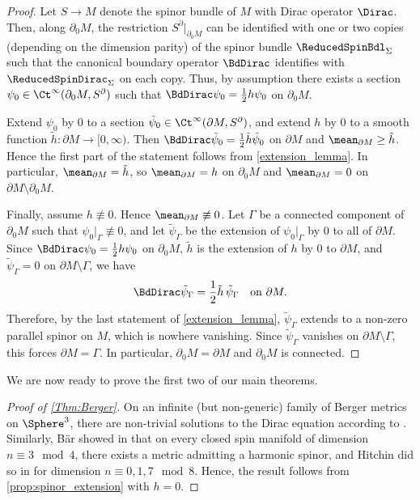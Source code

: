 \documentclass[a4paper,11pt]{amsart}
\numberwithin{equation}{section}
\begin{document}
\begin{proof}
    Let \(S \to M\) denote the spinor bundle of \(M\) with Dirac operator \(\Dirac\).
    Then, along \(\partial_0 M\), the restriction \(S^\partial|_{\partial_0 M}\) can be identified with one or two copies (depending on the dimension parity) of the spinor bundle \(\ReducedSpinBdl_\Sigma\) such that the canonical boundary operator \(\BdDirac\) identifies with \(\ReducedSpinDirac_\Sigma\) on each copy.
    Thus, by assumption there exists a section \(\psi_0 \in \Ct^\infty(\partial_0 M, S^\partial)\) such that \(\BdDirac \psi_0 = \frac{1}{2} h \psi_0\) on \(\partial_0 M\).

    Extend \(\psi_0\) by \(0\) to a section \(\tilde\psi_0 \in \Ct^\infty(\partial M, S^\partial)\), and extend \(h\) by \(0\) to a smooth function \(\tilde h \colon \partial M \to [0,\infty)\).
    Then \(\BdDirac \tilde\psi_0 = \frac{1}{2} \tilde h \tilde\psi_0\) on \(\partial M\) and \(\mean_{\partial M} \geq \tilde h\).
    Hence the first part of the statement follows from \cref{extension_lemma}.
    In particular, \(\mean_{\partial M}=\tilde h\), so \(\mean_{\partial M}=h\) on \(\partial_0M\) and \(\mean_{\partial M}=0\) on \(\partial M\setminus\partial_0M\).

    Finally, assume \(h \not\equiv 0\).
    Hence \(\mean_{\partial M}\not\equiv 0\).
    Let \(\Gamma\) be a connected component of \(\partial_0M\) such that \(\psi_0|_{\Gamma}\not\equiv 0\), and let \(\tilde\psi_\Gamma\) be the extension of \(\psi_0|_{\Gamma}\) by \(0\) to all of \(\partial M\).
    Since \(\BdDirac\psi_0=\frac{1}{2}h\psi_0\) on \(\partial_0M\), \(\tilde h\) is the extension of \(h\) by \(0\) to \(\partial M\), and \(\tilde\psi_\Gamma=0\) on \(\partial M\setminus\Gamma\), we have
    \[
      \BdDirac \tilde\psi_\Gamma = \frac{1}{2}\tilde h\,\tilde\psi_\Gamma
      \quad\text{on }\partial M.
    \]
    Therefore, by the last statement of \cref{extension_lemma}, \(\tilde\psi_\Gamma\) extends to a non-zero parallel spinor on \(M\), which is nowhere vanishing.
    Since \(\tilde\psi_\Gamma\) vanishes on \(\partial M\setminus\Gamma\), this forces \(\partial M=\Gamma\).
    In particular, \(\partial_0M=\partial M\) and \(\partial_0M\) is connected.
\end{proof}

We are now ready to prove the first two of our main theorems.

\begin{proof}[Proof of \cref{Thm:Berger}]
    On an infinite (but non-generic) family of Berger metrics on \(\Sphere^3\), there are non-trivial solutions to the Dirac equation according to \cite[\S3.1]{Hitchin}.
    Similarly, Bär showed in \cite{Baer_Harmonic_spinors} that on every closed spin manifold of dimension $n\equiv 3 \mod 4$, there exists a metric admitting a harmonic spinor, and Hitchin did so in \cite[Theorem 4.5]{Hitchin} for dimension $n\equiv 0,1,7\mod 8$.
    Hence, the result follows from \cref{prop:spinor_extension} with \(h = 0\).
\end{proof}
\end{document}
